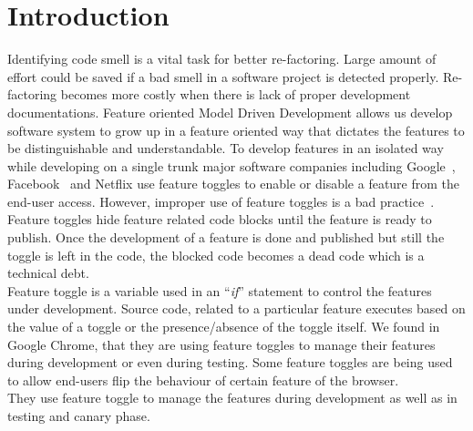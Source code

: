 \documentclass[conference]{IEEEtran}
\begin{document}
\section{Introduction}
Identifying code smell is a vital task for better re-factoring. Large amount of effort could be saved if a bad smell in a software project is detected properly. Re-factoring becomes more costly when there is lack of proper development documentations. Feature oriented Model Driven Development allows us develop software system to grow up in a feature oriented way that dictates the features to be distinguishable and understandable. To develop features in an isolated way while developing on a single trunk major software companies including Google~\cite{ChromeRepidRelease}, Facebook~\cite{Rossi2014Google} and Netflix use feature toggles to enable or disable a feature from the end-user access. However, improper use of feature toggles is a bad practice~\cite{Fowler2010FeatureToggle}. Feature toggles hide feature 
related code blocks until the feature is ready to publish. Once the 
development of a feature is done and published but still the toggle is 
left in the code, the blocked code becomes a dead code which is a technical 
debt.\\

Feature toggle is a variable used in an ``\textit{if}'' statement to control the 
features under development. Source code, related to a particular feature executes 
based on the value of a toggle or the presence/absence of the toggle itself. 
We found in Google Chrome, that they are using feature toggles to manage their 
features during development or even during testing. Some feature toggles are 
being used to allow end-users flip the behaviour of certain feature of the browser.\\

They use feature toggle to manage the features during development as well as 
in testing and canary phase.
\end{document}
